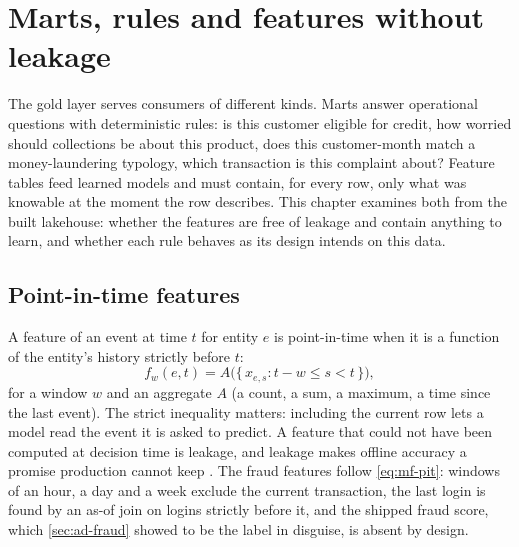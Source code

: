 \chapter{Marts, rules and features without leakage}\label{ch:marts-and-features}

The gold layer serves consumers of different kinds. Marts answer operational questions with deterministic rules: is this
customer eligible for credit, how worried should collections be about this product, does this customer-month match a
money-laundering typology, which transaction is this complaint about? Feature tables feed learned models and must
contain, for every row, only what was knowable at the moment the row describes. This chapter examines both from the
built lakehouse: whether the features are free of leakage and contain anything to learn, and whether each rule behaves
as its design intends on this data.

\section{Point-in-time features}\label{sec:mf-pit}

A feature of an event at time $t$ for entity $e$ is point-in-time when it is a function of the entity's history strictly
before $t$:
\begin{equation}\label{eq:mf-pit}
  f_w(e, t) = A\bigl(\{\, x_{e,s} : t - w \le s < t \,\}\bigr),
\end{equation}
for a window $w$ and an aggregate $A$ (a count, a sum, a maximum, a time since the last event). The strict inequality
matters: including the current row lets a model read the event it is asked to predict. A feature that could not have been
computed at decision time is leakage, and leakage makes offline accuracy a promise production cannot keep
\autocite{kaufman2012}. The fraud features follow \cref{eq:mf-pit}: windows of an hour, a day and a week exclude the
current transaction, the last login is found by an as-of join on logins strictly before it, and the shipped fraud score,
which \cref{sec:ad-fraud} showed to be the label in disguise, is absent by design.

